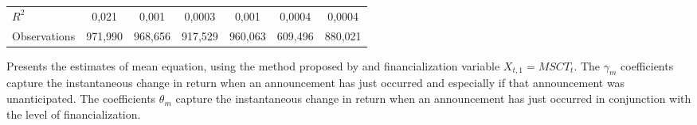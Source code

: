 \begin{landscape}
\begin{table}[]
{\begin{tabular}{lllllllllllll}
$R^2$ &
  \multicolumn{2}{c}{0,021} &
  \multicolumn{2}{c}{0,001} &
  \multicolumn{2}{c}{0,0003} &
  \multicolumn{2}{c}{0,001} &
  \multicolumn{2}{c}{0,0004} &
  \multicolumn{2}{c}{0,0004} \\
Observations &
  \multicolumn{2}{c}{971,990} &
  \multicolumn{2}{c}{968,656} &
  \multicolumn{2}{c}{917,529} &
  \multicolumn{2}{c}{960,063} &
  \multicolumn{2}{c}{609,496} &
  \multicolumn{2}{c}{880,021} \\ \hline
\end{tabular}%
}
\singlespacing
        \footnotesize
 Presents the estimates of mean equation, using the method proposed by \citep{andersen2007real} and financialization variable $X_{t,1}=MSCT_t$. The $\gamma_m$ coefficients capture the instantaneous change in return when an announcement has just occurred and especially if that announcement was unanticipated. The coefficients $\theta_m$ capture the instantaneous change in return when an announcement has just occurred in conjunction with the level of financialization.
\end{table}
\end{landscape}

